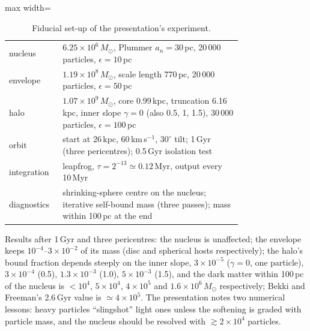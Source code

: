 \documentclass[11pt,a4paper]{article}
\begin{document}
\begin{table}[h]\centering
\caption{Fiducial set-up of the presentation's experiment.}
\begin{adjustbox}{max width=\linewidth}
\begin{tabular}{lp{0.77\linewidth}}\toprule
nucleus & $6.25\times10^{6}\,M_\odot$, Plummer $a_n=30$\,pc, 20\,000 particles, $\epsilon=10$\,pc\\
envelope & $1.19\times10^{8}\,M_\odot$, scale length 770\,pc, 20\,000 particles, $\epsilon=50$\,pc\\
halo & $1.07\times10^{9}\,M_\odot$, core 0.99\,kpc, truncation 6.16\,kpc, inner slope $\gamma=0$ (also 0.5, 1, 1.5), 30\,000 particles, $\epsilon=100$\,pc\\
orbit & start at 26\,kpc, 60\,km\,s$^{-1}$, $30^\circ$ tilt; 1\,Gyr (three pericentres); 0.5\,Gyr isolation test\\
integration & leapfrog, $\tau=2^{-13}\simeq0.12$\,Myr, output every 10\,Myr\\
diagnostics & shrinking-sphere centre on the nucleus; iterative self-bound mass (three passes); mass within 100\,pc at the end\\
\bottomrule\end{tabular}
\end{adjustbox}
\end{table}

Results after 1\,Gyr and three pericentres: the nucleus is unaffected; the envelope keeps $10^{-4}$--$3\times10^{-2}$ of its mass (disc and spherical hosts respectively); the halo's bound fraction depends steeply on the inner slope, $3\times10^{-5}$ ($\gamma=0$, one particle), $3\times10^{-4}$ (0.5), $1.3\times10^{-3}$ (1.0), $5\times10^{-3}$ (1.5), and the dark matter within 100\,pc of the nucleus is $<10^{4}$, $5\times10^{4}$, $4\times10^{5}$ and $1.6\times10^{6}\,M_\odot$ respectively; Bekki and Freeman's 2.6\,Gyr value is $\simeq4\times10^{5}$. The presentation notes two numerical lessons: heavy particles ``slingshot'' light ones unless the softening is graded with particle mass, and the nucleus should be resolved with $\gtrsim2\times10^{4}$ particles.
\end{document}
